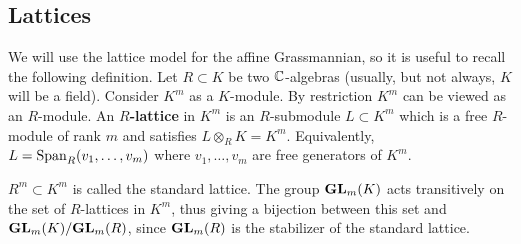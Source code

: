 \documentclass{article} %
\begin{document}

\subsection{Lattices}
\label{ss:lat}
We will use the lattice model for the affine Grassmannian, so it is useful to recall the following definition. Let $ R \subset K$ be two $\mathbb C$-algebras (usually, but not always, $K$ will be a field). 
Consider $ K^m $ as a $K$-module. 
By restriction $ K^m$ can be viewed as an $R$-module.  An \textbf{$R$-lattice} in $K^m$ 
is an $R$-submodule $ L \subset K^m$ 
which is a free $R$-module of rank $ m $ and satisfies $ L \otimes_R K = K^m $. Equivalently, $ L = \operatorname{Span}_R(v_1, \dots, v_m)$ where $v_1, \dots, v_m$ are free generators of $K^m$. 
% 
\begin{comment}
\jcom{Maybe need that both $K$ and $R$ are integral domains and have the same field of fractions?} 
\acom{Roger has proved that what is written is ok.}
\rcom{Here's my argument: If $L \subset K^m$ is a free rank $m$ $R$-module and $L \otimes K = K^m$, then it's clear we that $L$ is generated by $m$ generators $v_1,\dots,v_m$ over $R$. Since $L\otimes K = K^m$, these also generate $K^m$ over $K$. Then we have a surjective map $K^m \twoheadrightarrow K^m$ given by sending a basis of $K^m$ to the generators $v_1,\dots,v_m$. Since any surjective endomorphism of finite $K$-modules is injective, the $v_1,\dots,v_m$ form a basis. I think the only thing that is needed is that the rings are commutative.}
\jcom{Great.}
\end{comment} 

$ R^m \subset K^m $ is called the standard lattice. 
The group ${\mathbf{GL}}_m(K) $ acts transitively on the set of $R$-lattices in $K^m$, thus giving a bijection between 
this set and ${\mathbf{GL}}_m(K)/{\mathbf{GL}}_m(R)$, since $ {\mathbf{GL}}_m(R) $ is the stabilizer of the standard lattice. 
\end{document}
